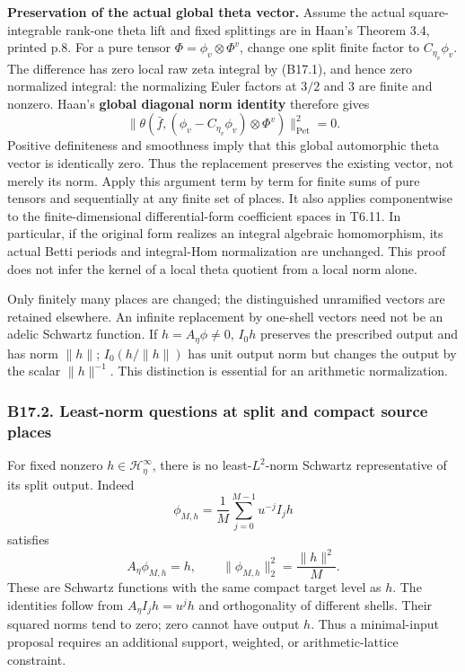 \textbf{Preservation of the actual global theta vector.} Assume the actual square-integrable rank-one theta lift and fixed splittings are in Haan's Theorem 3.4, printed p.8. For a pure tensor \(\Phi=\phi_v\otimes\Phi^v\), change one split finite factor to \(C_{\eta_v}\phi_v\). The difference has zero local raw zeta integral by (B17.1), and hence zero normalized integral: the normalizing Euler factors at \(3/2\) and \(3\) are finite and nonzero. Haan's \textbf{global diagonal norm identity} therefore gives \[
 \|\theta(\bar f,(\phi_v-C_{\eta_v}\phi_v)\otimes\Phi^v)\|_{\mathrm{Pet}}^2=0.
\] Positive definiteness and smoothness imply that this global automorphic theta vector is identically zero. Thus the replacement preserves the existing vector, not merely its norm. Apply this argument term by term for finite sums of pure tensors and sequentially at any finite set of places. It also applies componentwise to the finite-dimensional differential-form coefficient spaces in T6.11. In particular, if the original form realizes an integral algebraic homomorphism, its actual Betti periods and integral-Hom normalization are unchanged. This proof does not infer the kernel of a local theta quotient from a local norm alone.

Only finitely many places are changed; the distinguished unramified vectors are retained elsewhere. An infinite replacement by one-shell vectors need not be an adelic Schwartz function. If \(h=A_\eta\phi\ne0\), \(I_0h\) preserves the prescribed output and has norm \(\|h\|\); \(I_0(h/\|h\|)\) has unit output norm but changes the output by the scalar \(\|h\|^{-1}\). This distinction is essential for an arithmetic normalization.

\subsubsection{B17.2. Least-norm questions at split and compact source places}\label{b17.2.-least-norm-questions-at-split-and-compact-source-places}

For fixed nonzero \(h\in\mathcal H_\eta^\infty\), there is no least-\(L^2\)-norm Schwartz representative of its split output. Indeed \[
 \phi_{M,h}=\frac1M\sum_{j=0}^{M-1}u^{-j}I_jh
\] satisfies \[
 A_\eta\phi_{M,h}=h,\qquad
 \|\phi_{M,h}\|_2^2=\frac{\|h\|^2}{M}.
\tag{B17.3}
\] These are Schwartz functions with the same compact target level as \(h\). The identities follow from \(A_\eta I_jh=u^jh\) and orthogonality of different shells. Their squared norms tend to zero; zero cannot have output \(h\). Thus a minimal-input proposal requires an additional support, weighted, or arithmetic-lattice constraint.

